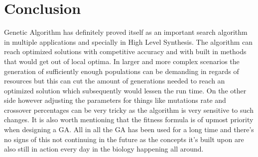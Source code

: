 \documentclass[conference]{IEEEtran}
\begin{document}
\section{Conclusion}
Genetic Algorithm has definitely proved itself as an important search algorithm in multiple applications and specially in High Level Synthesis. The algorithm can reach optimized solutions with competitive accuracy and with built in methods that would get out of local optima. In larger and more complex scenarios the generation of sufficiently enough populations can be demanding in regards of resources but this can cut the amount of generations needed to reach an optimized solution which subsequently would lessen the run time. On the other side however adjusting the parameters for things like mutations rate and crossover percentages can be very tricky as the algorithm is very sensitive to such changes. It is also worth mentioning that the fitness formula is of upmost priority when designing a GA. All in all the GA has been used for a long time and there's no signs of this not continuing in the future as the concepts it's built upon are also still in action every day in the biology happening all around.
 

\end{document}
